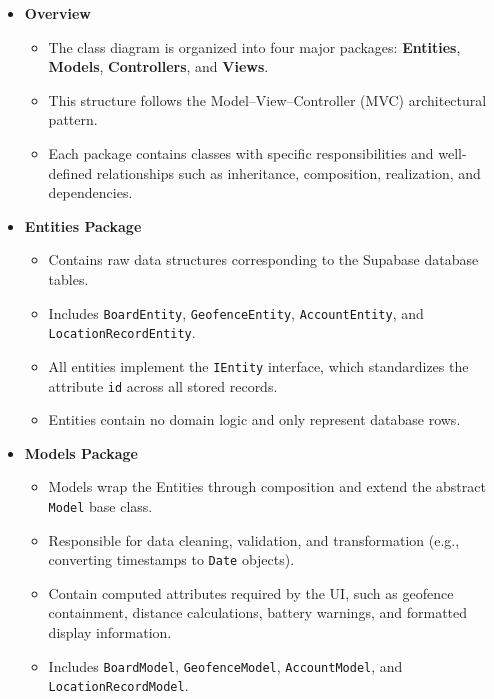 \begin{itemize}

    \item \textbf{Overview}
    \begin{itemize}
        \item The class diagram is organized into four major packages: \textbf{Entities}, \textbf{Models}, \textbf{Controllers}, and \textbf{Views}.
        \item This structure follows the Model--View--Controller (MVC) architectural pattern.
        \item Each package contains classes with specific responsibilities and well-defined relationships such as inheritance, composition, realization, and dependencies.
    \end{itemize}

    \item \textbf{Entities Package}
    \begin{itemize}
        \item Contains raw data structures corresponding to the Supabase database tables.
        \item Includes \texttt{BoardEntity}, \texttt{GeofenceEntity}, \texttt{AccountEntity}, and \texttt{LocationRecordEntity}.
        \item All entities implement the \texttt{IEntity} interface, which standardizes the attribute \texttt{id} across all stored records.
        \item Entities contain no domain logic and only represent database rows.
    \end{itemize}

    \item \textbf{Models Package}
    \begin{itemize}
        \item Models wrap the Entities through composition and extend the abstract \texttt{Model} base class.
        \item Responsible for data cleaning, validation, and transformation (e.g., converting timestamps to \texttt{Date} objects).
        \item Contain computed attributes required by the UI, such as geofence containment, distance calculations, battery warnings, and formatted display information.
        \item Includes \texttt{BoardModel}, \texttt{GeofenceModel}, \texttt{AccountModel}, and \texttt{LocationRecordModel}.
    \end{itemize}


\end{itemize}

